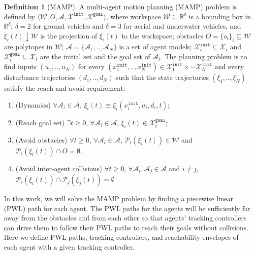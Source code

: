 \documentclass[letterpaper]{article} %
\theoremstyle{definition}
\newtheorem{definition}{Definition}
\begin{document}
\begin{definition}[MAMP]
A multi-agent motion planning (MAMP) problem is defined by
$\langle \mathcal{W}, O, \mathcal{A},\mathcal{X}^\texttt{init}, \mathcal{X}^\texttt{goal} \rangle \nonumber$, where workspace $\mathcal{W} \subseteq \mathbb{R}^\delta$ is a bounding box in $\mathbb{R}^\delta$; $\delta=2$ for ground vehicles and $\delta = 3$ for aerial and underwater vehicles, and $\xi_i(t) \downarrow \mathcal{W}$ is the projection of $\xi_i(t)$ to the workspace; obstacles $O = \{o_i\}_i \subseteq \mathcal{W}$ are polytopes in $\mathcal{W}$; $\mathcal{A} = \{\mathcal{A}_1,..,\mathcal{A}_N\}$ is a set of agent models; $\mathcal{X}^{\texttt{init}}_i \subseteq \mathcal{X}_i $ and $\mathcal{X}^{\texttt{goal}}_i \subseteq \mathcal{X}_i$ are the initial set and the goal set of  $\mathcal{A}_i$.
The planning problem is to find inputs  $(u_1,..,u_N)$ for every $(x^\texttt{init}_1,..,x^\texttt{init}_N) \in \mathcal{X}^{\texttt{init}}_1  \times \cdots \mathcal{X}^{\texttt{init}}_N$ and every disturbance trajectories $(d_1,..,d_N)$ such that the state trajectories $(\xi_1,..,\xi_N)$ satisfy the
reach-and-avoid requirement: 
\begin{enumerate}
    \item (Dynamics) $\forall \mathcal{A}_i \in \mathcal{A}$, $\xi_i(t) \equiv \xi_i(x^\texttt{init}_i,u_i,d_i,t)$;
    \item (Reach goal set) $\exists t \geq 0$, $\forall \mathcal{A}_i \in \mathcal{A}$, $\xi_i(t) \in \mathcal{X}_{i}^\texttt{goal}$;
    \item (Avoid obstacles) $\forall t \geq 0$, $\forall \mathcal{A}_i \in \mathcal{A}$,  $\mathcal{P}_i(\xi_i(t)) \in \mathcal{W}$ and $\mathcal{P}_i(\xi_i(t)) \cap O = \emptyset$.
    \item (Avoid inter-agent collisions) $\forall t \geq 0$, $\forall \mathcal{A}_i, \mathcal{A}_j \in \mathcal{A}$ and $i \not = j$,   $\mathcal{P}_i(\xi_i(t)) \cap \mathcal{P}_j(\xi_j(t)) = \emptyset$
\end{enumerate}
\end{definition}

In this work, we will solve the MAMP problem by finding a  piecewise linear (PWL) path for each agent. The PWL paths for the agents will be sufficiently far away from the obstacles and from each other so that agents' tracking controllers can drive them to follow their PWL paths to reach their goals without collisions. Here we define PWL paths, tracking controllers, and reachability envelopes of each agent with a given tracking controller.
\end{document}
